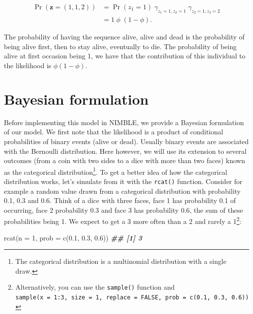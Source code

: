 \documentclass[
  12pt,
]{krantz}
\newenvironment{Shaded}{\begin{snugshade}}{\end{snugshade}}
\newcommand{\AttributeTok}[1]{\textcolor[rgb]{0.77,0.63,0.00}{#1}}
\newcommand{\DecValTok}[1]{\textcolor[rgb]{0.00,0.00,0.81}{#1}}
\newcommand{\DocumentationTok}[1]{\textcolor[rgb]{0.56,0.35,0.01}{\textbf{\textit{#1}}}}
\newcommand{\FloatTok}[1]{\textcolor[rgb]{0.00,0.00,0.81}{#1}}
\newcommand{\FunctionTok}[1]{\textcolor[rgb]{0.00,0.00,0.00}{#1}}
\newcommand{\NormalTok}[1]{#1}
\begin{document}
\begin{align*}
\Pr(\mathbf{z} = (1, 1, 2)) &= \Pr(z_1 = 1) \; \gamma_{z_{1} = 1, z_{2} = 1} \; \gamma_{z_{2} = 1, z_{3} = 2}\\
                            &= 1 \; \phi \; (1 - \phi).
\end{align*}

The probability of having the sequence alive, alive and dead is the probability of being alive first, then to stay alive, eventually to die. The probability of being alive at first occasion being 1, we have that the contribution of this individual to the likelihood is \(\phi (1 - \phi)\).

\hypertarget{bayesian-formulation}{%
\section{Bayesian formulation}\label{bayesian-formulation}}

Before implementing this model in NIMBLE, we provide a Bayesian formulation of our model. We first note that the likelihood is a product of conditional probabilities of binary events (alive or dead). Usually binary events are associated with the Bernoulli distribution. Here however, we will use its extension to several outcomes (from a coin with two sides to a dice with more than two faces) known as the categorical distribution\footnote{The categorical distribution is a multinomial distribution with a single draw.}. To get a better idea of how the categorical distribution works, let's simulate from it with the \texttt{rcat()} function. Consider for example a random value drawn from a categorical distribution with probability 0.1, 0.3 and 0.6. Think of a dice with three faces, face 1 has probability 0.1 of occurring, face 2 probability 0.3 and face 3 has probability 0.6, the sum of these probabilities being 1. We expect to get a 3 more often than a 2 and rarely a 1\footnote{Alternatively, you can use the \texttt{sample()} function and \texttt{sample(x\ =\ 1:3,\ size\ =\ 1,\ replace\ =\ FALSE,\ prob\ =\ c(0.1,\ 0.3,\ 0.6))}}:

\begin{Shaded}
\begin{Highlighting}[]
\FunctionTok{rcat}\NormalTok{(}\AttributeTok{n =} \DecValTok{1}\NormalTok{, }\AttributeTok{prob =} \FunctionTok{c}\NormalTok{(}\FloatTok{0.1}\NormalTok{, }\FloatTok{0.3}\NormalTok{, }\FloatTok{0.6}\NormalTok{))}
\DocumentationTok{\#\# [1] 3}
\end{Highlighting}
\end{Shaded}
\end{document}
